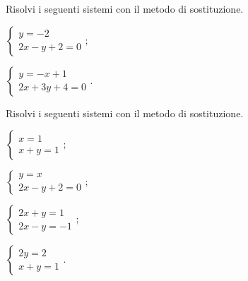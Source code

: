 \begin{esercizio}
 \label{ese:21.7}
Risolvi i seguenti sistemi con il metodo di sostituzione.
 \begin{multicols}{2}
 \begin{enumeratea}
  \item $\left\{\begin{array}{l}
     y=-2\\
     2x-y+2=0
    \end{array}\right.;$
  \item $\left\{\begin{array}{l}
	   y=-x+1\\
	   2x+3y+4=0
       \end{array}\right..$
 \end{enumeratea}
 \end{multicols}
\end{esercizio}

\begin{esercizio}[\Ast]
 \label{ese:21.8}
Risolvi i seguenti sistemi con il metodo di sostituzione.
 \begin{multicols}{2}
 \begin{enumeratea}
  \item $\left\{\begin{array}{l}
        x=1\\
        x+y=1
       \end{array}
\right.;$
\item $\left\{\begin{array}{l}
        y=x\\
        2x-y+2=0
       \end{array}\right.;$
\item $\left\{\begin{array}{l}
		2x+y=1\\
		2x-y=-1
	  \end{array}\right.;$
\item $\left\{\begin{array}{l}
	   2y=2\\
	   x+y=1
	\end{array}\right..$
 \end{enumeratea}
 \end{multicols}
\end{esercizio}

